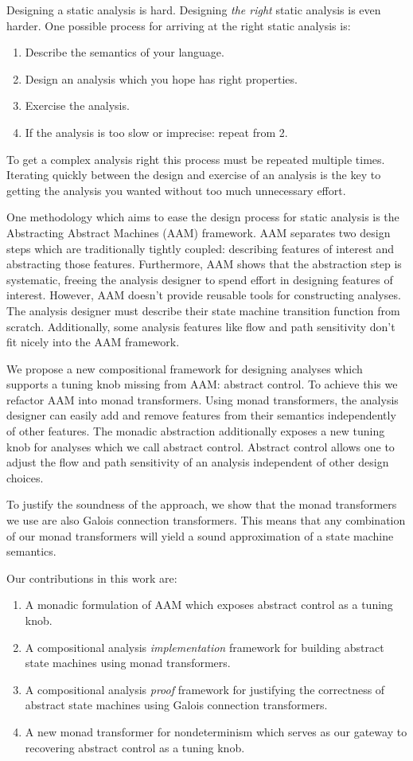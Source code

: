 \documentclass{article}
\begin{document}
Designing a static analysis is hard.
Designing \emph{the right} static analysis is even harder.
One possible process for arriving at the right static analysis is:
\begin{enumerate}
\item Describe the semantics of your language.
\item Design an analysis which you hope has right properties.
\item Exercise the analysis.
\item If the analysis is too slow or imprecise: repeat from 2.
\end{enumerate}
To get a complex analysis right this process must be repeated multiple times.
Iterating quickly between the design and exercise of an analysis is the key to getting the analysis you wanted without too much unnecessary effort.

One methodology which aims to ease the design process for static analysis is the Abstracting Abstract Machines (AAM) 
  framework\cite{van-horn:2010:aam}.
AAM separates two design steps which are traditionally tightly coupled: describing features of interest and abstracting those features.
Furthermore, AAM shows that the abstraction step is systematic, freeing the analysis designer to spend effort in designing features of interest.
However, AAM doesn't provide reusable tools for constructing analyses.
The analysis designer must describe their state machine transition function from scratch.
Additionally, some analysis features like flow and path sensitivity don't fit nicely into the AAM framework.

We propose a new compositional framework for designing analyses which supports a tuning knob missing from AAM: abstract control.
To achieve this we refactor AAM into monad transformers.
Using monad transformers, the analysis designer can easily add and remove features from their semantics independently of other features.
The monadic abstraction additionally exposes a new tuning knob for analyses which we call abstract control.
Abstract control allows one to adjust the flow and path sensitivity of an analysis independent of other design choices.

To justify the soundness of the approach, we show that the monad transformers we use are also Galois connection transformers.
This means that any combination of our monad transformers will yield a sound approximation of a state machine semantics.

Our contributions in this work are:
\begin{enumerate}
\item A monadic formulation of AAM which exposes abstract control as a tuning knob.
\item A compositional analysis \emph{implementation} framework for building abstract state machines using monad transformers.
\item A compositional analysis \emph{proof} framework for justifying the correctness of abstract state machines using Galois connection transformers.
\item A new monad transformer for nondeterminism which serves as our gateway to recovering abstract control as a tuning knob.
\end{enumerate}
\end{document}
